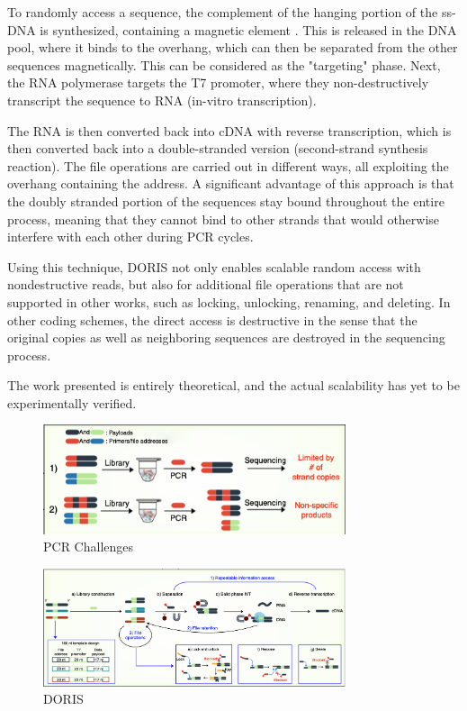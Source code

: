 \documentclass[a4paper,conference]{IEEEtran}
\begin{document}
To randomly access a sequence, the complement of the hanging portion of the ss-DNA is synthesized, containing a magnetic element \cite{}. This is released in the DNA pool, where it binds to the overhang, which can then be separated from the other sequences magnetically. This can be considered as the "targeting" phase. Next, the RNA polymerase targets the T7 promoter, where they non-destructively transcript the sequence to RNA (in-vitro transcription).

The RNA is then converted back into cDNA with reverse transcription, which is then converted back into a double-stranded version (second-strand synthesis reaction). The file operations are carried out in different ways, all exploiting the overhang containing the address. A significant advantage of this approach is that the doubly stranded portion of the sequences stay bound throughout the entire process, meaning that they cannot bind to other strands that would otherwise interfere with each other during PCR cycles.

Using this technique, DORIS not only enables scalable random access with nondestructive reads, but also for additional file operations that are not supported in other works, such as locking, unlocking, renaming, and deleting. In other coding schemes, the direct access is destructive in the sense that the original copies as well as neighboring sequences are destroyed in the sequencing process. 

The work presented is entirely theoretical, and the actual scalability has yet to be experimentally verified. 

\begin{figure}[!t]
\centering
\includegraphics[width=3.5in]{pcrchallenges}
\caption{PCR Challenges}
\label{pcr_challenges}
\end{figure}

\begin{figure}[!t]
\centering
\includegraphics[width=3.5in]{doris}
\caption{DORIS}
\label{doris}
\end{figure}
\end{document}
